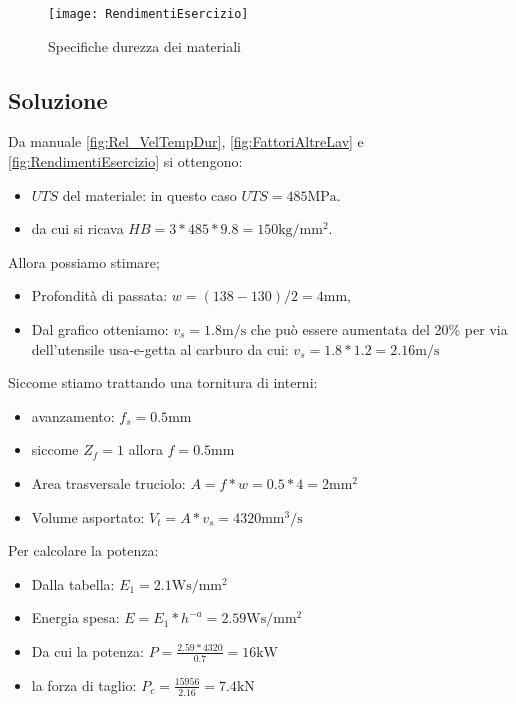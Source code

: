 \begin{figure}
\centering
\texttt{[image: RendimentiEsercizio]}
\caption{Specifiche durezza dei materiali}
\label{fig:RendimentiEsercizio}
\end{figure}

\subsection*{Soluzione}
Da manuale \eqref{fig:Rel_VelTempDur}, \eqref{fig:FattoriAltreLav} e \eqref{fig:RendimentiEsercizio} si ottengono: 
\begin{itemize}
\item $UTS$ del materiale: in questo caso $UTS = 485\unit{\MPa}$.
\item da cui si ricava $HB = 3*485*9.8=150\unit{\kg/\mm^2}$.
\end{itemize}
Allora possiamo stimare;
\begin{itemize}
\item Profondità di passata: $w = (138-130)/2 = 4\unit{\mm}$,
\item Dal grafico otteniamo: $v_s = 1.8\unit{\m/\s}$ che può essere aumentata del 20\% per via dell'utensile usa-e-getta al carburo da cui: $v_s = 1.8 * 1.2 = 2.16\unit{\m/\s}$
\end{itemize}
Siccome stiamo trattando una tornitura di interni:
\begin{itemize}
\item avanzamento: $f_s = 0.5\unit{\mm}$
\item siccome $Z_f = 1$ allora $f = 0.5\unit{\mm}$
\item Area trasversale truciolo: $A = f*w = 0.5*4 = 2\unit{\mm^2}$
\item Volume asportato: $V_t = A * v_s = 4320\unit{\mm^3/\s}$
\end{itemize}
Per calcolare la potenza:
\begin{itemize}
\item Dalla tabella: $E_1 = 2.1\unit{\W\s/\mm^2}$
\item Energia spesa: $E = E_1 * h^{-a}= 2.59\unit{\W\s/\mm^2}$
\item Da cui la potenza: $P = \frac{2.59 * 4320}{0.7} = 16\unit{\kW}$
\item la forza di taglio: $P_c = \frac{15956}{2.16} = 7.4\unit{\kN}$
\end{itemize}

